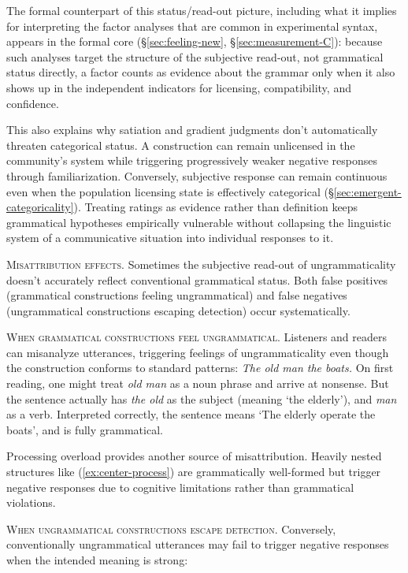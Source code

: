 \documentclass[12pt,letterpaper]{article}
\newcommand{\mention}[1]{\textit{#1}}
\begin{document}
The formal counterpart of this status/read-out picture, including what it implies for interpreting the factor analyses that are common in experimental syntax, appears in the formal core (\S\ref{sec:feeling-new}, \S\ref{sec:measurement-C}): because such analyses target the structure of the subjective read-out, not grammatical status directly, a factor counts as evidence about the grammar only when it also shows up in the independent indicators for licensing, compatibility, and confidence.

This also explains why satiation and gradient judgments don't automatically threaten categorical status. A construction can remain unlicensed in the community's system while triggering progressively weaker negative responses through familiarization. Conversely, subjective response can remain continuous even when the population licensing state is effectively categorical (\S\ref{sec:emergent-categoricality}). Treating ratings as evidence rather than definition keeps grammatical hypotheses empirically vulnerable without collapsing the linguistic system of a communicative situation into individual responses to it.

\noindent\textsc{Misattribution effects.} Sometimes the subjective read-out of ungrammaticality doesn't accurately reflect conventional grammatical status. Both false positives (grammatical constructions feeling ungrammatical) and false negatives (ungrammatical constructions escaping detection) occur systematically.

\noindent\textsc{When grammatical constructions feel ungrammatical.} Listeners and readers can misanalyze utterances, triggering feelings of ungrammaticality even though the construction conforms to standard patterns:
\ea
\mention{The old man the boats.} \autocite{ritchie1984}\label{ex:the-old-mislabel}
\z
On first reading, one might treat \mention{old man} as a noun phrase and arrive at nonsense. But the sentence actually has \mention{the old} as the subject (meaning `the elderly'), and \mention{man} as a verb. Interpreted correctly, the sentence means `The elderly operate the boats', and is fully grammatical.

Processing overload provides another source of misattribution. Heavily nested structures like (\ref{ex:center-process}) are grammatically well-formed but trigger negative responses due to cognitive limitations rather than grammatical violations.

\noindent\textsc{When ungrammatical constructions escape detection.} Conversely, conventionally ungrammatical utterances may fail to trigger negative responses when the intended meaning is strong:
\end{document}
